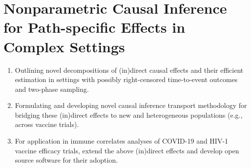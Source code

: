 \section{Nonparametric Causal Inference for Path-specific Effects in Complex
  Settings}

\begin{enumerate}[label=(\alph*)]
  \itemsep0.2pt
  \item Outlining novel decompositions of (in)direct causal effects and their
    efficient estimation in settings with possibly right-censored time-to-event
    outcomes and two-phase sampling.
  \item Formulating and developing novel causal inference transport methodology
    for bridging these (in)direct effects to new and heterogeneous populations
    (e.g., across vaccine trials).
  \item For application in immune correlates analyses of COVID-19 and HIV-1
     vaccine efficacy trials, extend the above (in)direct effects and develop
     open source software for their adoption.
\end{enumerate}

